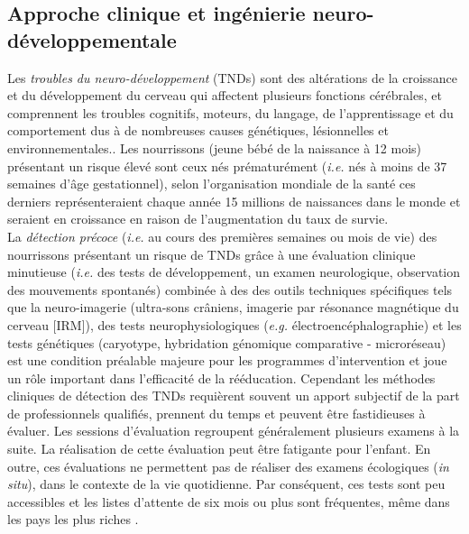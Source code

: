 \documentclass[5pt]{article}
\begin{document}
\subsection{Approche clinique et ingénierie neuro-développementale}
\par Les \textit{troubles du  neuro-développement} (TNDs) sont des altérations de la croissance et du développement du cerveau qui affectent plusieurs fonctions cérébrales, et comprennent les troubles cognitifs, moteurs, du langage, de l'apprentissage et du comportement dus à de nombreuses causes  génétiques, lésionnelles et environnementales.\cite{development_americas_nodate}. Les nourrissons (jeune bébé de la naissance à 12 mois)  présentant un risque élevé sont ceux nés prématurément (\textit{i.e.} nés à moins de 37 semaines d'âge gestationnel)\cite{cecchi_caretoy_2016}, selon l'organisation mondiale de la santé ces derniers représenteraient chaque année 15 millions de naissances dans le monde et seraient en croissance en raison de l'augmentation du taux de survie\cite{blencowe_national_2012}.\\
La \textit{détection précoce} (\textit{i.e.} au cours des premières semaines ou mois de vie) des nourrissons présentant un risque de TNDs grâce à une évaluation clinique minutieuse (\textit{i.e.} des tests de développement, un examen neurologique, observation des mouvements spontanés) combinée à des des outils techniques spécifiques tels que la neuro-imagerie (ultra-sons crâniens, imagerie par résonance magnétique du cerveau [IRM]), des tests neurophysiologiques (\textit{e.g.} électroencéphalographie) et les tests génétiques (caryotype, hybridation génomique comparative - microréseau)\cite{cioni_early_2016}  est une condition préalable majeure pour les programmes d'intervention et joue un rôle important dans l'efficacité de la rééducation\cite{orton_early_2009,spittle_early_2015}. Cependant les méthodes cliniques de détection des TNDs requièrent souvent un apport subjectif de la part de professionnels qualifiés, prennent du temps et peuvent être fastidieuses à évaluer. Les sessions d'évaluation regroupent généralement plusieurs examens à la suite. La réalisation de cette évaluation peut être fatigante pour l'enfant. En outre, ces évaluations ne permettent pas de réaliser des examens écologiques (\textit {in situ}), dans le contexte de la vie quotidienne.  Par conséquent, ces tests sont peu accessibles et les listes d'attente de six mois ou plus sont fréquentes, même dans les pays les plus riches \cite{gargot_automatic_2022}.\\
\end{document}
